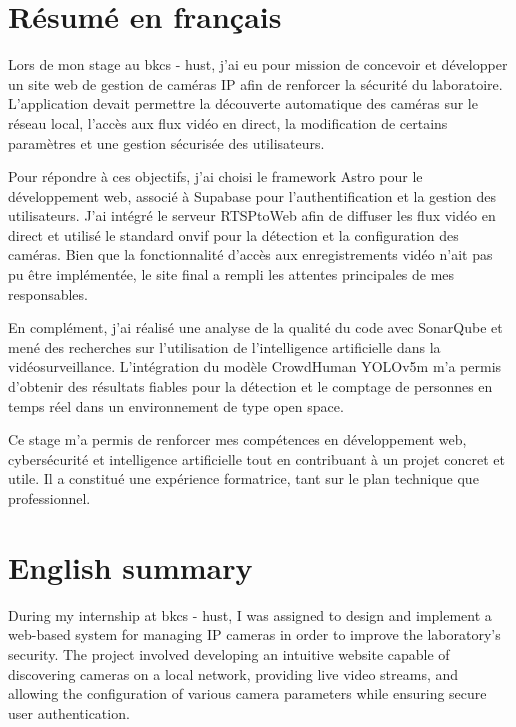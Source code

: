 
\newpage
\printbibliography[heading=bibintoc]



\begin{appendices}

\chapter{Résumé en français}

Lors de mon stage au \acrshort{bkcs} - \acrshort{hust}, j’ai eu pour mission de concevoir et développer un site web de gestion de caméras IP afin de renforcer la sécurité du laboratoire. L’application devait permettre la découverte automatique des caméras sur le réseau local, l’accès aux flux vidéo en direct, la modification de certains paramètres et une gestion sécurisée des utilisateurs.

Pour répondre à ces objectifs, j’ai choisi le framework Astro pour le développement web, associé à Supabase pour l’authentification et la gestion des utilisateurs. J’ai intégré le serveur RTSPtoWeb afin de diffuser les flux vidéo en direct et utilisé le standard \acrshort{onvif} pour la détection et la configuration des caméras. Bien que la fonctionnalité d’accès aux enregistrements vidéo n’ait pas pu être implémentée, le site final a rempli les attentes principales de mes responsables.

En complément, j’ai réalisé une analyse de la qualité du code avec SonarQube et mené des recherches sur l’utilisation de l’intelligence artificielle dans la vidéosurveillance. L’intégration du modèle CrowdHuman YOLOv5m m’a permis d’obtenir des résultats fiables pour la détection et le comptage de personnes en temps réel dans un environnement de type open space.

Ce stage m’a permis de renforcer mes compétences en développement web, cybersécurité et intelligence artificielle tout en contribuant à un projet concret et utile. Il a constitué une expérience formatrice, tant sur le plan technique que professionnel.

\chapter{English summary}

During my internship at \acrshort{bkcs} - \acrshort{hust}, I was assigned to design and implement a web-based system for managing IP cameras in order to improve the laboratory’s security. The project involved developing an intuitive website capable of discovering cameras on a local network, providing live video streams, and allowing the configuration of various camera parameters while ensuring secure user authentication.


\end{appendices}
